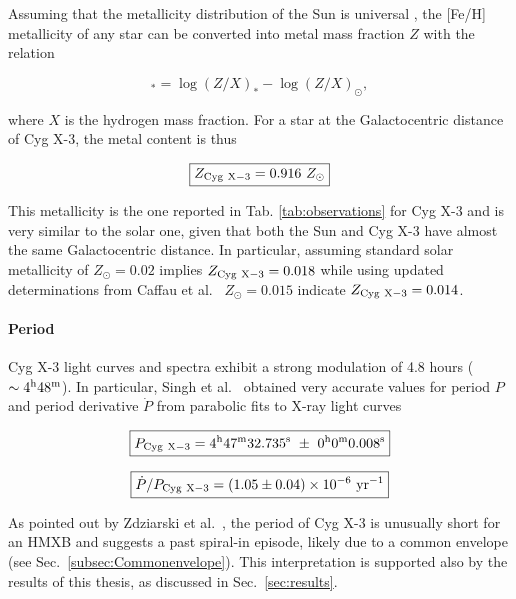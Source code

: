 \documentclass[a4paper,titlepage]{book}     	%
\newcommand{\sun}{\ensuremath{_\odot}}
\newcommand{\zsun}{\ensuremath{Z\sun}}
\newcommand{\yr}{\text{yr}}
\begin{document}
Assuming that the metallicity distribution of the Sun is universal \cite{metallicityFeHconversion}, the [Fe/H] metallicity of any star can be converted into metal mass fraction $Z$ with the relation 

\begin{equation}
    [\rm Fe/H]_* = \log(Z/X)_* - \log(Z/X)_\odot{},
\end{equation}


where $X$ is the hydrogen mass fraction. For a star at the Galactocentric distance of Cyg X-3, the metal content is thus

\begin{equation}\label{eq:CygX3metallicity}
    \boxed{Z_{\rm Cyg~X-3} = 0.916~\zsun}
\end{equation}

This metallicity is the one reported in Tab. \ref{tab:observations} for Cyg X-3 and is  very similar to the solar one, given that both the Sun and Cyg X-3 have almost the same Galactocentric distance. In particular, assuming standard solar metallicity of $\zsun =0.02$ implies $Z_{\rm Cyg~X-3} = 0.018$ while using updated determinations from Caffau et al.\ \cite{caffau2011solarmetallicity} $\zsun=0.015$ indicate $Z_{\rm Cyg~X-3}=0.014$.


\paragraph{Period} Cyg X-3 light curves and spectra exhibit a strong modulation of 4.8 hours ($\sim 4^{\rm h} 48^{\rm m}$). In particular, Singh et al.\ \cite{CygX-3_Singh2002} obtained very accurate values for period $P$ and period derivative $\dot{P}$ from parabolic fits to X-ray light curves

\begin{equation}\label{eq:periodCygX3}
    \boxed{P_{\rm Cyg~X-3} = 4^{\rm h} 47^{\rm m} 32.735^{\rm s}~\pm~0^{\rm h} 0^{\rm m} 0.008^{\rm s}}
\end{equation}

\begin{equation}\label{eq:pdotCygX3}
    \boxed{\dot{P}/P_{\rm Cyg~X-3} = (1.05 \pm 0.04) \times 10^{-6}~\yr^{-1}}
\end{equation}

As pointed out by Zdziarski et al.\ \cite{Cyg-X3_Zd2013}, the period of Cyg X-3 is unusually short for an HMXB and suggests a past spiral-in episode, likely due to a common envelope (see Sec.\ \ref{subsec:Commonenvelope}). This interpretation is supported also by the results of this thesis, as discussed in Sec.\ \ref{sec:results}.
\end{document}

